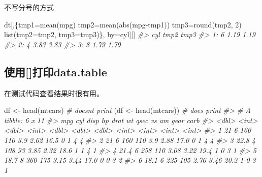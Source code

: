 \documentclass[
]{book}
\newenvironment{Shaded}{\begin{snugshade}}{\end{snugshade}}
\newcommand{\AttributeTok}[1]{\textcolor[rgb]{0.77,0.63,0.00}{#1}}
\newcommand{\CommentTok}[1]{\textcolor[rgb]{0.56,0.35,0.01}{\textit{#1}}}
\newcommand{\DecValTok}[1]{\textcolor[rgb]{0.00,0.00,0.81}{#1}}
\newcommand{\FunctionTok}[1]{\textcolor[rgb]{0.00,0.00,0.00}{#1}}
\newcommand{\NormalTok}[1]{#1}
\newcommand{\OtherTok}[1]{\textcolor[rgb]{0.56,0.35,0.01}{#1}}
\newcommand{\SpecialCharTok}[1]{\textcolor[rgb]{0.00,0.00,0.00}{#1}}
\begin{document}
不写分号的方式

\begin{Shaded}
\begin{Highlighting}[]
\NormalTok{dt[,\{tmp1}\OtherTok{=}\FunctionTok{mean}\NormalTok{(mpg)}
\NormalTok{     tmp2}\OtherTok{=}\FunctionTok{mean}\NormalTok{(}\FunctionTok{abs}\NormalTok{(mpg}\SpecialCharTok{{-}}\NormalTok{tmp1))}
\NormalTok{     tmp3}\OtherTok{=}\FunctionTok{round}\NormalTok{(tmp2, }\DecValTok{2}\NormalTok{)}
     \FunctionTok{list}\NormalTok{(}\AttributeTok{tmp2=}\NormalTok{tmp2, }\AttributeTok{tmp3=}\NormalTok{tmp3)\},}
\NormalTok{   by}\OtherTok{=}\NormalTok{cyl][]}
\CommentTok{\#\textgreater{}    cyl tmp2 tmp3}
\CommentTok{\#\textgreater{} 1:   6 1.19 1.19}
\CommentTok{\#\textgreater{} 2:   4 3.83 3.83}
\CommentTok{\#\textgreater{} 3:   8 1.79 1.79}
\end{Highlighting}
\end{Shaded}

\hypertarget{ux4f7fux7528ux6253ux5370data.table}{%
\subsection{使用{[}{]}打印data.table}\label{ux4f7fux7528ux6253ux5370data.table}}

在测试代码查看结果时很有用。

\begin{Shaded}
\begin{Highlighting}[]
\NormalTok{df }\OtherTok{\textless{}{-}} \FunctionTok{head}\NormalTok{(mtcars) }\CommentTok{\# doesn\textquotesingle{}t print}
\NormalTok{(df }\OtherTok{\textless{}{-}} \FunctionTok{head}\NormalTok{(mtcars)) }\CommentTok{\# does print}
\CommentTok{\#\textgreater{} \# A tibble: 6 x 11}
\CommentTok{\#\textgreater{}     mpg   cyl  disp    hp  drat    wt  qsec    vs    am  gear  carb}
\CommentTok{\#\textgreater{}   \textless{}dbl\textgreater{} \textless{}int\textgreater{} \textless{}dbl\textgreater{} \textless{}int\textgreater{} \textless{}dbl\textgreater{} \textless{}dbl\textgreater{} \textless{}dbl\textgreater{} \textless{}int\textgreater{} \textless{}int\textgreater{} \textless{}int\textgreater{} \textless{}int\textgreater{}}
\CommentTok{\#\textgreater{} 1  21       6   160   110  3.9   2.62  16.5     0     1     4     4}
\CommentTok{\#\textgreater{} 2  21       6   160   110  3.9   2.88  17.0     0     1     4     4}
\CommentTok{\#\textgreater{} 3  22.8     4   108    93  3.85  2.32  18.6     1     1     4     1}
\CommentTok{\#\textgreater{} 4  21.4     6   258   110  3.08  3.22  19.4     1     0     3     1}
\CommentTok{\#\textgreater{} 5  18.7     8   360   175  3.15  3.44  17.0     0     0     3     2}
\CommentTok{\#\textgreater{} 6  18.1     6   225   105  2.76  3.46  20.2     1     0     3     1}
\end{Highlighting}
\end{Shaded}
\end{document}
